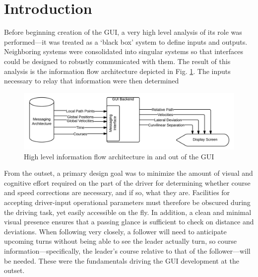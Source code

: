 \documentclass[12pt]{report}
\begin{document}
\section{Introduction} \label{sec:guiintro}

Before beginning creation of the GUI, a very high level analysis of its role was performed---it was treated as a `black box' system to define inputs and outputs. Neighboring systems were consolidated into singular systems so that interfaces could be designed to robustly communicated with them. The result of this analysis is the information flow architecture depicted in Fig. \ref{fig:blackboxflow}.
The inputs necessary to relay that information were then determined

\begin{figure}[ht] \label{fig:blackboxflow} \centering
    \includegraphics[width=6.5in]{./figs/blackbox_flowchart.png}
    \caption{High level information flow architecture in and out of the GUI}
\end{figure}

From the outset, a primary design goal was to minimize the amount of visual and cognitive effort required on the part of the driver for determining whether course and speed corrections are necessary, and if so, what they are. Facilities for accepting driver-input operational parameters must therefore be obscured during the driving task, yet easily accessible on the fly. In addition, a clean and minimal visual presence ensures that a passing glance is sufficient to check on distance and deviations. When following very closely, a follower will need to anticipate upcoming turns without being able to see the leader actually turn, so course information---specifically, the leader's course relative to that of the follower---will be needed.  These were the fundamentals driving the GUI development at the outset.
\end{document}
